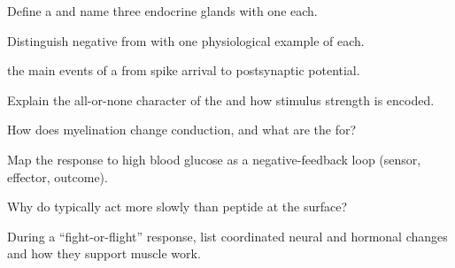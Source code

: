 \begin{exercise}[$\star$]\label{exo:g12:nerves-hormones:3}
Define a  and name three endocrine glands with one  each.
\end{exercise}

\begin{exercise}[$\star$]\label{exo:g12:nerves-hormones:4}
Distinguish negative from  with one physiological
example of each.
\end{exercise}

\begin{exercise}[$\star\star$]\label{exo:g12:nerves-hormones:5}
 the main events of a  from spike arrival to
postsynaptic potential.
\end{exercise}

\begin{exercise}[$\star\star$]\label{exo:g12:nerves-hormones:6}
Explain the all-or-none character of the  and how
stimulus strength is encoded.
\end{exercise}

\begin{exercise}[$\star\star$]\label{exo:g12:nerves-hormones:7}
How does myelination change conduction, and what are the  for?
\end{exercise}

\begin{exercise}[$\star\star$]\label{exo:g12:nerves-hormones:8}
Map the  response to high blood glucose as a negative-feedback
loop (sensor, effector, outcome).
\end{exercise}

\begin{exercise}[$\star\star$]\label{exo:g12:nerves-hormones:9}
Why do   typically act more slowly than peptide 
at the  surface?
\end{exercise}

\begin{exercise}[$\star\star\star$]\label{exo:g12:nerves-hormones:10}
During a ``fight-or-flight'' response, list coordinated neural and
hormonal changes and how they support muscle work.
\end{exercise}

